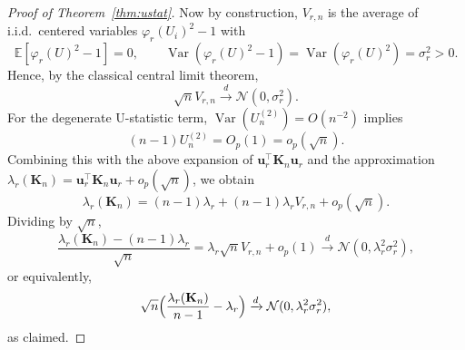 \documentclass[11pt]{article}
\theoremstyle{plain}
\theoremstyle{remark}
\DeclareMathOperator{\Var}{Var}
\begin{document}
\begin{proof}[Proof of Theorem~\ref{thm:ustat}]
Now by construction, $V_{r,n}$ is the average of i.i.d.\ centered variables
$\varphi_r(U_i)^2 - 1$ with
\[
\mathbb{E}[\varphi_r(U)^2 - 1] = 0,\qquad
\Var(\varphi_r(U)^2 - 1) = \Var(\varphi_r(U)^2) = \sigma_r^2 > 0.
\]
Hence, by the classical central limit theorem,
\[
\sqrt{n} V_{r,n} \xrightarrow{d} \mathcal{N}(0, \sigma_r^2).
\]
For the degenerate U-statistic term, $\Var(U_n^{(2)}) = O(n^{-2})$ implies
\[
(n-1)U_n^{(2)} = O_p(1) = o_p(\sqrt{n}).
\]
Combining this with the above expansion of
$\mathbf{u}_r^\top \mathbf{K}_n \mathbf{u}_r$ and the approximation
$\lambda_r(\mathbf{K}_n) = \mathbf{u}_r^\top \mathbf{K}_n \mathbf{u}_r + o_p(\sqrt n)$, we obtain
\[
\lambda_r(\mathbf{K}_n) = (n-1)\lambda_r + (n-1)\lambda_r V_{r,n} + o_p(\sqrt{n}).
\]
Dividing by $\sqrt{n}$,
\[
\frac{\lambda_r(\mathbf{K}_n) - (n-1)\lambda_r}{\sqrt{n}}
= \lambda_r \sqrt{n} V_{r,n} + o_p(1)
\xrightarrow{d} \mathcal{N}(0, \lambda_r^2 \sigma_r^2),
\]
or equivalently,
\[
\sqrt{n}\Bigl(\frac{\lambda_r(\mathbf{K}_n)}{n-1} - \lambda_r\Bigr)
\xrightarrow{d} \mathcal{N}(0, \lambda_r^2 \sigma_r^2),
\]
as claimed.




\end{proof}
\end{document}
